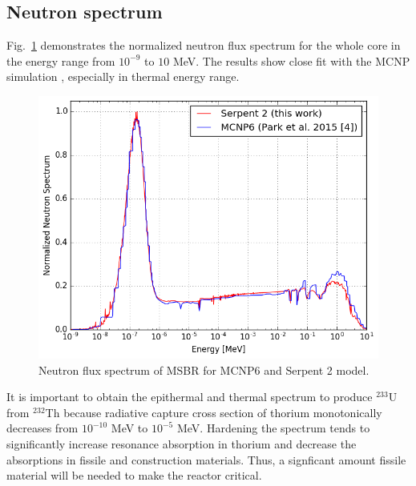 \documentclass{anstrans}
\begin{document}
\subsection{Neutron spectrum}
Fig.~\ref{fig:spectrum} demonstrates the normalized neutron flux spectrum for the whole core in the energy range from $10^{-9}$ to $10$ MeV. The results show close fit with the MCNP simulation \cite{park_whole_2015}, especially in thermal energy range. 
\begin{figure}[h!] %
  \centering
  \includegraphics[width=1.05\linewidth]{figure_3_1.png} 
  \caption{Neutron flux spectrum of \gls{MSBR} for MCNP6 and Serpent 2 model.}
  \label{fig:spectrum}
\end{figure}
It is important to obtain the epithermal and thermal spectrum to produce 
$^{233}$U from $^{232}$Th because radiative capture cross section of thorium 
monotonically decreases from $10^{-10}$ MeV to $10^{-5}$ MeV. Hardening the 
spectrum tends to significantly increase resonance absorption in thorium and 
decrease the absorptions in fissile and construction materials. Thus, 
a signficant amount fissile material will be needed to make the reactor critical.
\end{document}
